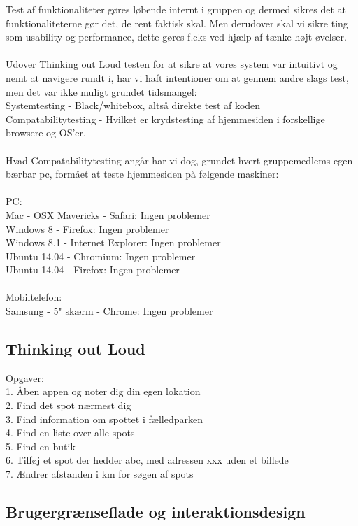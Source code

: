 \documentclass[12pt]{article}
\begin{document}
Test af funktionaliteter gøres løbende internt i gruppen og dermed sikres det at funktionaliteterne gør det, de rent faktisk skal. Men derudover skal vi sikre ting som usability og performance, dette gøres f.eks ved hjælp af tænke højt øvelser.\\\\
Udover Thinking out Loud testen for at sikre at vores system var intuitivt og nemt at navigere rundt i, har vi haft intentioner om at gennem andre slags test, men det var ikke muligt grundet tidsmangel:\\
Systemtesting - Black/whitebox, altså direkte test af koden\\
Compatabilitytesting - Hvilket er krydstesting af hjemmesiden i forskellige browsere og OS'er.\\\\
Hvad Compatabilitytesting angår har vi dog, grundet hvert gruppemedlems egen bærbar pc, formået at teste hjemmesiden på følgende maskiner:\\\\
PC:\\
Mac - OSX Mavericks - Safari: Ingen problemer\\
Windows 8 - Firefox: Ingen problemer\\
Windows 8.1 - Internet Explorer: Ingen problemer\\
Ubuntu 14.04 - Chromium: Ingen problemer\\
Ubuntu 14.04 - Firefox: Ingen problemer\\\\
Mobiltelefon:\\
Samsung - 5" skærm - Chrome: Ingen problemer

\subsection*{Thinking out Loud}
Opgaver:\\
1. Åben appen og noter dig din egen lokation\\
2. Find det spot nærmest dig\\
3. Find information om spottet i fælledparken\\
4. Find en liste over alle spots\\
5. Find en butik\\
6. Tilføj et spot der hedder abc, med adressen xxx uden et billede\\
7. Ændrer afstanden i km for søgen af spots

\pagebreak
\subsection{Brugergrænseflade og interaktionsdesign}
\end{document}
